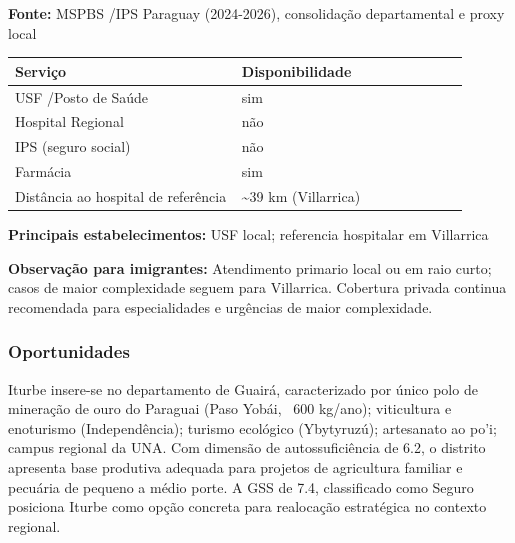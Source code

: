 \textbf{Fonte:} MSPBS /\allowbreak  IPS Paraguay (2024-2026), consolidação
departamental e proxy local

{\def\LTcaptype{none} %
\begin{longtable}{@{}>{\raggedright\arraybackslash}p{0.45\linewidth} >{\raggedright\arraybackslash}p{0.45\linewidth}@{}}
\toprule\noalign{}
Serviço & Disponibilidade \\
\midrule\noalign{}
\endhead
\bottomrule\noalign{}
\endlastfoot
USF /\allowbreak  Posto de Saúde & sim \\
Hospital Regional & não \\
IPS (seguro social) & não \\
Farmácia & sim \\
Distância ao hospital de referência & \textasciitilde39 km
(Villarrica) \\
\end{longtable}
}

\textbf{Principais estabelecimentos:} USF local; referencia hospitalar
em Villarrica

\textbf{Observação para imigrantes:} Atendimento primario local ou em
raio curto; casos de maior complexidade seguem para Villarrica.
Cobertura privada continua recomendada para especialidades e urgências
de maior complexidade.
\newpage

\subsubsection*{Oportunidades}\label{oport-iturbe-0409}
Iturbe insere-se no departamento de Guairá, caracterizado por único polo de mineração de ouro do Paraguai (Paso Yobái, ~600 kg/ano); viticultura e enoturismo (Independência); turismo ecológico (Ybytyruzú); artesanato ao po'i; campus regional da UNA. Com dimensão de autossuficiência de 6.2, o distrito apresenta base produtiva adequada para projetos de agricultura familiar e pecuária de pequeno a médio porte. A GSS de 7.4, classificado como Seguro posiciona Iturbe como opção concreta para realocação estratégica no contexto regional.

